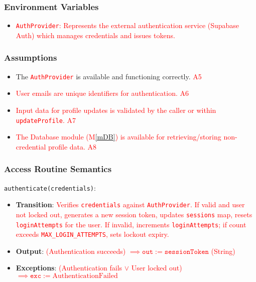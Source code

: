 \documentclass[12pt, titlepage]{article}
\providecommand{\mref}[1]{M\ref{#1}}
\begin{document}
\subsubsection{Environment Variables}
\begin{itemize}
    \item \textcolor{red}{\texttt{AuthProvider}: Represents the external authentication service (Supabase Auth) which manages credentials and issues tokens.}
\end{itemize}

\subsubsection{Assumptions}
\begin{itemize}
    \item The \textcolor{red}{\texttt{AuthProvider}} is available and functioning correctly. \textcolor{red}{A5}
    \item \textcolor{red}{User emails are unique identifiers for authentication.} \textcolor{red}{A6}
    \item \textcolor{red}{Input data for profile updates is validated by the caller or within \texttt{updateProfile}. A7}
    \item \textcolor{red}{The Database module (\mref{mDB}) is available for retrieving/storing non-credential profile data. A8}
\end{itemize}

\subsubsection{Access Routine Semantics}
\noindent \texttt{authenticate(credentials)}:
\begin{itemize}
    \item \textbf{Transition}: \textcolor{red}{Verifies \texttt{credentials} against \texttt{AuthProvider}. If valid and user not locked out, generates a new session token, updates \texttt{sessions} map, resets \texttt{loginAttempts} for the user. If invalid, increments \texttt{loginAttempts}; if count exceeds \texttt{MAX\_LOGIN\_ATTEMPTS}, sets lockout expiry.}
    \item \textbf{Output}: \textcolor{red}{(Authentication succeeds) $\implies \texttt{out} := \texttt{sessionToken}$ (String)}
    \item \textbf{Exceptions}: \textcolor{red}{(Authentication fails $\lor$ User locked out) $\implies \texttt{exc} := \text{AuthenticationFailed}$}
\end{itemize}
\end{document}
